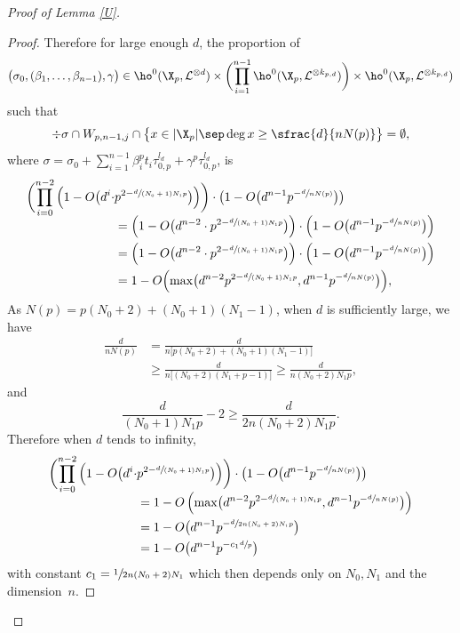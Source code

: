 \begin{proof}[Proof of Lemma \ref{U}]
\begin{proof}[Proof]
Therefore for large enough $d$, the proportion of
\[
\big(\sigma_0, (\beta_1,\dots, \beta_{n-1}), \gamma\big)\in \ho^0(\X_p,\mathcal{L}^{\otimes d})\times \biggl(\prod_{i=1}^{n-1} \ho^0(\X_p,\mathcal{L}^{\otimes k_{p,d}}) \biggr) \times \ho^0(\X_p, \mathcal{L}^{\otimes k_{p,d}})
\]
such that
\[
\div \sigma\cap W_{p,n-1,j}\cap \bigl\{ x\in |\X_p|\sep \deg x\geq\sfrac{d}{nN(p)} \bigr\}=\emptyset,
\]
where $\sigma=\sigma_0+\sum_{i=1}^{n-1} \beta_i^pt_i\tau_{0,p}^{l_d}+\gamma^p\tau_{0,p}^{l_d}$, is
\begin{align*}
\biggl(\prod_{i=0}^{n-2}\Big(1-O\big(d^i\cdot &p^{2-\sfrac{d}{(N_0+1)N_1p}}\big) \Big) \biggr) \cdot \bigl(1-O\big(d^{n-1}p^{-\sfrac{d}{nN(p)}}\big) \bigr) \\[-5pt]
&=\left(1-O\big(d^{n-2}\cdot p^{2-\sfrac{d}{(N_0+1)N_1p}} \big)\right)\cdot \left(1-O\big(d^{n-1}p^{-\sfrac{d}{nN(p)}}\big) \right) \\
&=\left(1-O\big(d^{n-2}\cdot p^{2-\sfrac{d}{(N_0+1)N_1p}} \big)\right)\cdot \left(1-O\big(d^{n-1}p^{-\sfrac{d}{nN(p)}}\big) \right) \\
&=1-O\Bigl(\max\bigl(d^{n-2}p^{2-\sfrac{d}{(N_0+1)N_1p}}, d^{n-1}p^{-\sfrac{d}{nN(p)}}\bigr) \Bigr),
\end{align*}
As $N(p)=p(N_0+2)+(N_0+1)(N_1-1)$, when $d$ is sufficiently large, we have
\begin{align*}
\frac{d}{nN(p)}&= \frac{d}{n\big[p(N_0+2)+(N_0+1)(N_1-1)\big]}\\
&\geq \frac{d}{n\big[(N_0+2)(N_1+p-1)\big]}\geq \frac{d}{n(N_0+2)N_1 p},
\end{align*}
and
\[
\frac{d}{(N_0+1)N_1p}-2\geq \frac{d}{2n(N_0+2)N_1 p}.
\]
Therefore when $d$ tends to infinity,
\begin{align*}
\biggl(\prod_{i=0}^{n-2}\Big(1-O\big(d^i\cdot& p^{2-\sfrac{d}{(N_0+1)N_1p}}\big) \Big) \biggr) \cdot \bigl(1-O\big(d^{n-1}p^{-\sfrac{d}{nN(p)}}\big) \bigr) \\[-5pt]
&=1-O\left(\max\bigl(d^{n-2}p^{2-\sfrac{d}{(N_0+1)N_1p}}, d^{n-1}p^{-\sfrac{d}{nN(p)}}\bigr) \right)\\
&=1-O\bigl(d^{n-1}p^{-\sfrac{d}{2n(N_0+2)N_1 p}} \bigr)\\
&=1-O\bigl(d^{n-1}p^{-c_1\sfrac{d}{p}} \bigr)
\end{align*}
with constant $c_1=\sfrac{1}{2n(N_0+2)N_1 }$ which then depends only on $N_0,N_1$ and the dimension~$n$.
\Changelback
\end{proof}


\end{proof}
